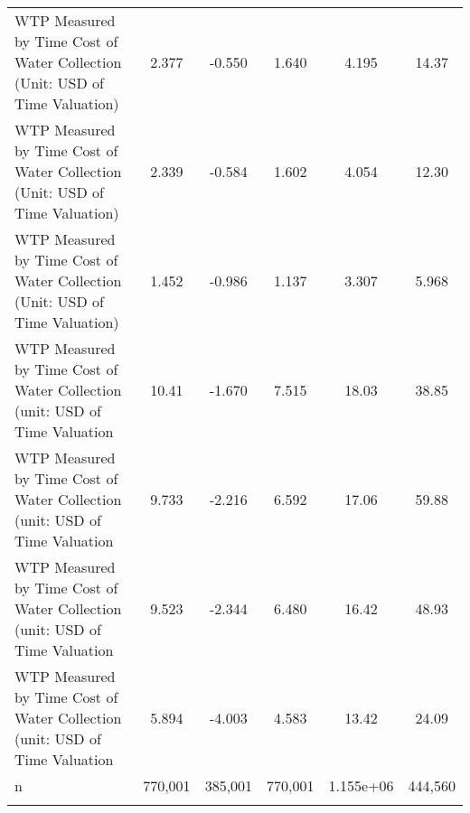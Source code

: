\begin{tabular}{lccccc}
WTP Measured by Time Cost of Water Collection (Unit: USD of Time Valuation) & 2.377 & -0.550 & 1.640 & 4.195 & 14.37 \\
WTP Measured by Time Cost of Water Collection (Unit: USD of Time Valuation) & 2.339 & -0.584 & 1.602 & 4.054 & 12.30 \\
WTP Measured by Time Cost of Water Collection (Unit: USD of Time Valuation) & 1.452 & -0.986 & 1.137 & 3.307 & 5.968 \\
WTP Measured by Time Cost of Water Collection (unit: USD of Time Valuation & 10.41 & -1.670 & 7.515 & 18.03 & 38.85 \\
WTP Measured by Time Cost of Water Collection (unit: USD of Time Valuation & 9.733 & -2.216 & 6.592 & 17.06 & 59.88 \\
WTP Measured by Time Cost of Water Collection (unit: USD of Time Valuation & 9.523 & -2.344 & 6.480 & 16.42 & 48.93 \\
WTP Measured by Time Cost of Water Collection (unit: USD of Time Valuation & 5.894 & -4.003 & 4.583 & 13.42 & 24.09 \\
n & 770,001 & 385,001 & 770,001 & 1.155e+06 & 444,560 \\
 &  &  &  &  &  \\ \hline
\end{tabular}
